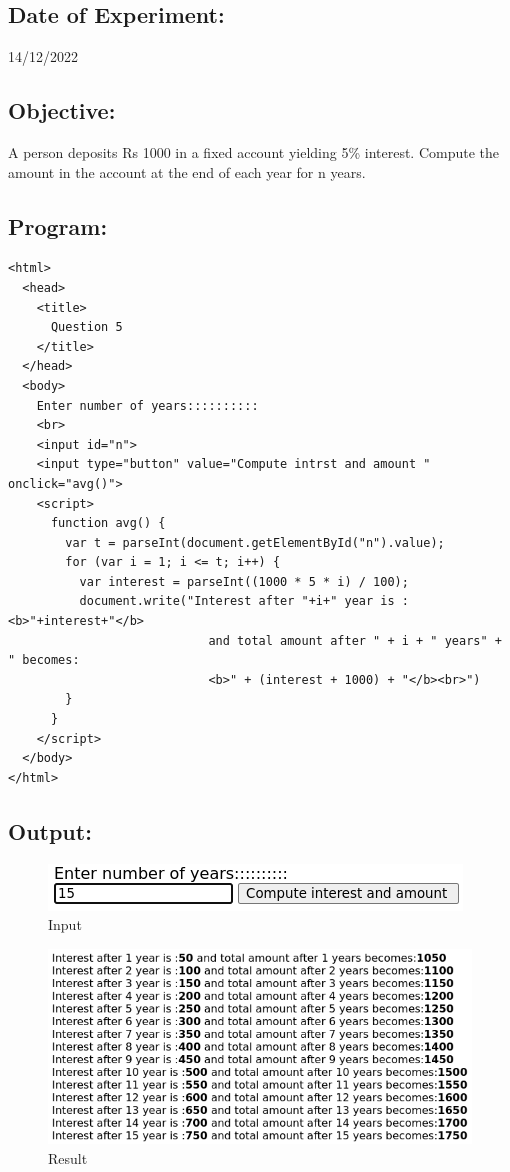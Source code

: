 \documentclass[12pt, a4paper]{article}
\begin{document}
\subsection*{Date of Experiment:}
14/12/2022
\subsection*{Objective:}
A person deposits Rs 1000 in a fixed account yielding 5\% interest. Compute the amount in the account at the end of each year for n years.

\subsection*{Program:}
\begin{lstlisting}
<html>
  <head>
    <title>
      Question 5
    </title>
  </head>
  <body>
    Enter number of years::::::::::
    <br>
    <input id="n">
    <input type="button" value="Compute intrst and amount " onclick="avg()">
    <script>
      function avg() {
        var t = parseInt(document.getElementById("n").value);
        for (var i = 1; i <= t; i++) {
          var interest = parseInt((1000 * 5 * i) / 100);
          document.write("Interest after "+i+" year is :<b>"+interest+"</b>
                            and total amount after " + i + " years" + " becomes:
                            <b>" + (interest + 1000) + "</b><br>")
        }
      }
    </script>
  </body>
</html>
\end{lstlisting}
\subsection*{Output:}
\setcounter{figure}{0}
\begin{figure}[h]
  \centering
  \includegraphics{36}
  \caption{Input}
\end{figure}

\begin{figure}[h]
  \centering
  \includegraphics[width=\textwidth]{37}
  \caption{Result}
\end{figure}
\end{document}
